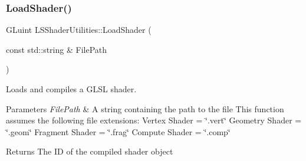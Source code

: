 \subsubsection{\texorpdfstring{Load\+Shader()}{LoadShader()}}
{\footnotesize\ttfamily G\+Luint L\+S\+Shader\+Utilities\+::\+Load\+Shader (\begin{DoxyParamCaption}\item[{const std\+::string \&}]{File\+Path }\end{DoxyParamCaption})}



Loads and compiles a G\+L\+SL shader. 


\begin{DoxyParams}{Parameters}
{\em File\+Path} & A string containing the path to the file This function assumes the following file extensions\+: Vertex Shader = \char`\"{}.\+vert\char`\"{} Geometry Shader = \char`\"{}.\+geom\char`\"{} Fragment Shader = \char`\"{}.\+frag\char`\"{} Compute Shader = \char`\"{}.\+comp\char`\"{} \\
\hline
\end{DoxyParams}
\begin{DoxyReturn}{Returns}
The ID of the compiled shader object 
\end{DoxyReturn}
